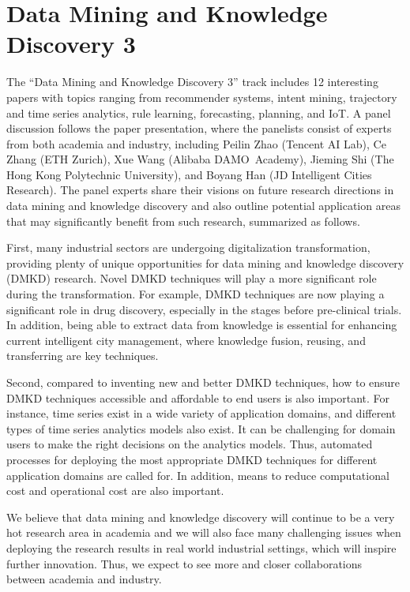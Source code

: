 \documentclass[11pt,dvipdfm]{article}
\begin{document}

\section{Data Mining and Knowledge Discovery 3}

The ``Data Mining and Knowledge Discovery 3'' track includes 12 interesting papers with topics ranging from recommender systems, intent mining, trajectory and time series analytics, rule learning, forecasting, planning, and IoT. A panel discussion follows the paper presentation, where the panelists consist of experts from both academia and industry, including Peilin Zhao (Tencent AI Lab), Ce Zhang (ETH Zurich), Xue Wang (Alibaba DAMO Academy), Jieming Shi (The Hong Kong Polytechnic University), and Boyang Han (JD Intelligent Cities Research). 
%
The panel experts share their visions on future research directions in data mining and knowledge discovery and also outline potential application areas that may significantly benefit  from such research, summarized as follows. 

First, many industrial sectors are undergoing digitalization transformation, providing plenty of unique opportunities for data mining and knowledge discovery (DMKD) research. Novel DMKD techniques will play a more significant role during the transformation. For example, DMKD techniques are now playing a significant role in drug discovery, especially in the stages before pre-clinical trials. In addition, being able to extract data from knowledge is essential for enhancing current intelligent city management, where knowledge fusion, reusing, and transferring are key techniques. 

Second, compared to inventing new and better DMKD techniques, how to ensure DMKD techniques accessible and affordable to end users is also important. For instance, time series exist in a wide variety of application domains, and different types of time series analytics models also exist. It can be challenging for domain users to make the right decisions on the analytics models. Thus, automated processes for deploying the most appropriate DMKD techniques for different application domains are called for. In addition, means to reduce computational cost and operational cost are also important. 

We believe that data mining and knowledge discovery will continue to be a very hot research area in academia and we will also face many challenging issues when deploying the research results in real world industrial settings, which will inspire further innovation. Thus, we expect to see more and closer collaborations between academia and industry. 
\end{document}
